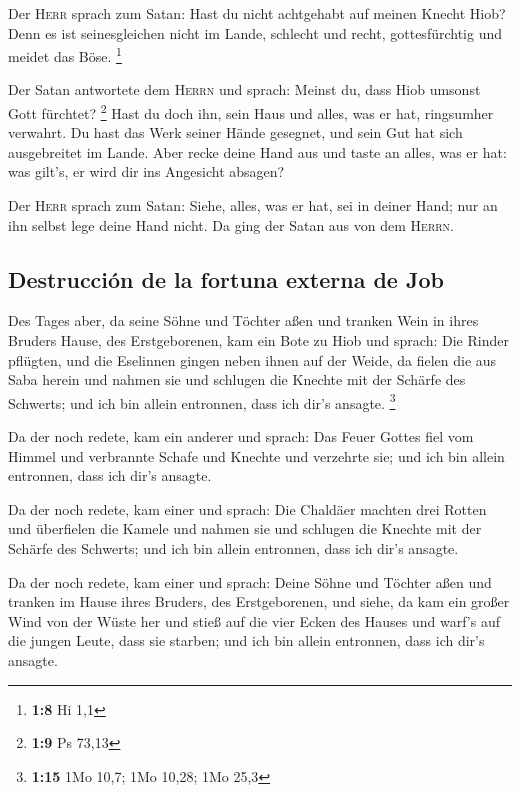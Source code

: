  Der \textsc{Herr} sprach zum Satan: Hast du nicht
achtgehabt auf meinen Knecht Hiob? Denn es ist seinesgleichen nicht im
Lande, schlecht und recht, gottesfürchtig und meidet das Böse.
\footnote{\textbf{1:8} Hi 1,1}

 Der Satan antwortete dem \textsc{Herrn} und sprach:
Meinst du, dass Hiob umsonst Gott fürchtet? \footnote{\textbf{1:9} Ps
  73,13}  Hast du doch ihn, sein Haus und alles, was er
hat, ringsumher verwahrt. Du hast das Werk seiner Hände gesegnet, und
sein Gut hat sich ausgebreitet im Lande.  Aber recke
deine Hand aus und taste an alles, was er hat: was gilt's, er wird dir
ins Angesicht absagen?

 Der \textsc{Herr} sprach zum Satan: Siehe, alles, was er
hat, sei in deiner Hand; nur an ihn selbst lege deine Hand nicht. Da
ging der Satan aus von dem \textsc{Herrn}.

\hypertarget{destrucciuxf3n-de-la-fortuna-externa-de-job}{%
\subsection{Destrucción de la fortuna externa de
Job}\label{destrucciuxf3n-de-la-fortuna-externa-de-job}}

 Des Tages aber, da seine Söhne und Töchter aßen und
tranken Wein in ihres Bruders Hause, des Erstgeborenen, 
kam ein Bote zu Hiob und sprach: Die Rinder pflügten, und die Eselinnen
gingen neben ihnen auf der Weide,  da fielen die aus Saba
herein und nahmen sie und schlugen die Knechte mit der Schärfe des
Schwerts; und ich bin allein entronnen, dass ich dir's ansagte.
\footnote{\textbf{1:15} 1Mo 10,7; 1Mo 10,28; 1Mo 25,3}

 Da der noch redete, kam ein anderer und sprach: Das
Feuer Gottes fiel vom Himmel und verbrannte Schafe und Knechte und
verzehrte sie; und ich bin allein entronnen, dass ich dir's ansagte.

 Da der noch redete, kam einer und sprach: Die Chaldäer
machten drei Rotten und überfielen die Kamele und nahmen sie und
schlugen die Knechte mit der Schärfe des Schwerts; und ich bin allein
entronnen, dass ich dir's ansagte.

 Da der noch redete, kam einer und sprach: Deine Söhne
und Töchter aßen und tranken im Hause ihres Bruders, des Erstgeborenen,
 und siehe, da kam ein großer Wind von der Wüste her und
stieß auf die vier Ecken des Hauses und warf's auf die jungen Leute,
dass sie starben; und ich bin allein entronnen, dass ich dir's ansagte.

